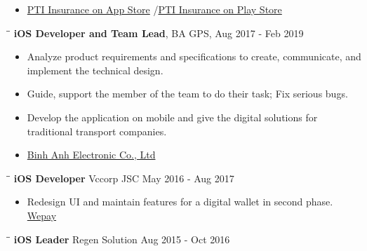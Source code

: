 \documentclass[margin, 10pt]{res}
\begin{document}
\begin{resume}
\begin{itemize}
   \item {\color{blue}\href{https://apps.apple.com/us/developer/pti-insurance/id1253321255}{PTI Insurance on App Store}} /{\color{blue}\href{https://play.google.com/store/apps/developer?id=PTI+Insurance}{PTI Insurance on Play Store}}
   \end{itemize}

   \begin{tabbing}
   \hspace{2.0in}\= \hspace{2.0in}\= \kill %
   {\large{\bf iOS Developer and Team Lead}}, BA GPS, Aug 2017 - Feb 2019\\
   \end{tabbing}\vspace{-20pt} %

   \begin{itemize}
		\item Analyze product requirements and specifications to create, communicate, and implement the technical design.
		\item Guide, support the member of the team to do their task; Fix serious bugs.
      \item Develop the application on mobile and give the digital solutions for traditional transport companies.
      \item {\color{blue}\href{https://itunes.apple.com/vn/developer/binh-anh-electronic-co-ltd/id1020602455?l=vi&mt=8}{Binh Anh Electronic Co., Ltd}}
   \end{itemize}

   \begin{tabbing}
   \hspace{2.0in}\= \hspace{2.0in}\= \kill %
   {\bf iOS Developer} \>Vccorp JSC \>May 2016 - Aug 2017\\
   \end{tabbing}\vspace{-20pt} %

   \begin{itemize}
      \item Redesign UI and maintain features for a digital wallet in second phase. 
      {\color{blue}\href{https://itunes.apple.com/au/app/vi-wepay/id1116328276?mt=8}{Wepay}}    \end{itemize}
   
   \begin{tabbing}
   \hspace{2.0in}\= \hspace{2.0in}\= \kill %
   {\bf iOS Leader} \>Regen Solution \>Aug 2015 - Oct 2016\\
   \end{tabbing}\vspace{-20pt} %


\end{resume}
\end{document}
